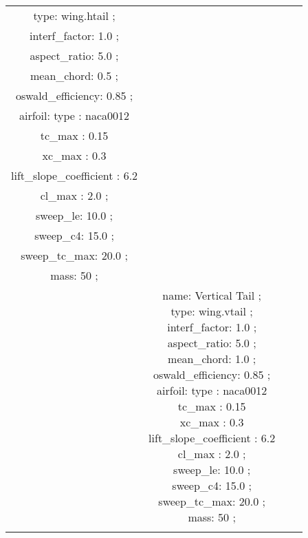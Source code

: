 \begin{table}[h]
\begin{adjustbox}{width=1\textwidth}
\begin{tabular}{|c|c|c|c|}
 type: wing.htail ; \\ interf\_factor: 1.0 ; \\ aspect\_ratio: 5.0 ; \\ mean\_chord: 0.5 ; \\ oswald\_efficiency: 0.85 ; \\ airfoil:   type :  naca0012  \\   tc\_max : 0.15 \\   xc\_max : 0.3 \\   lift\_slope\_coefficient : 6.2 \\   cl\_max : 2.0  ; \\ sweep\_le: 10.0 ; \\ sweep\_c4: 15.0 ; \\ sweep\_tc\_max: 20.0 ; \\ mass: 50 ; \\ } & \makecell{name: Vertical Tail ; \\ type: wing.vtail ; \\ interf\_factor: 1.0 ; \\ aspect\_ratio: 5.0 ; \\ mean\_chord: 1.0 ; \\ oswald\_efficiency: 0.85 ; \\ airfoil:   type :  naca0012  \\   tc\_max : 0.15 \\   xc\_max : 0.3 \\   lift\_slope\_coefficient : 6.2 \\   cl\_max : 2.0  ; \\ sweep\_le: 10.0 ; \\ sweep\_c4: 15.0 ; \\ sweep\_tc\_max: 20.0 ; \\ mass: 50 ; \\ }\\ \hline \\ 

\end{tabular}
\end{adjustbox}
\end{table}
